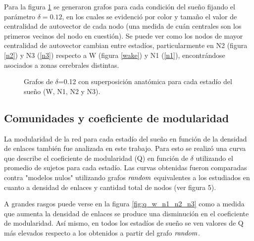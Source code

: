 \documentclass{article}
\begin{document}
Para la figura \ref{condiciones_w_n1_n2_n3} se generaron grafos para cada condición del sueño fijando el parámetro $\delta=0.12$, en los cuales se evidenció por color y tamaño el valor de centralidad de autovector de cada nodo (una medida de cuán centrales son los primeros vecinos del nodo en cuestión). Se puede ver como los nodos de mayor centralidad de autovector cambian entre estadíos, particularmente en N2 (figura \ref{n2}) y N3 (\ref{n3}) respecto a W (figura \ref{wake}) y N1 (\ref{n1}), encontrándose asociados a zonas cerebrales distintas.

\begin{figure}[H]
    \centering
    \hfill
    \hfill
    \hfill
    \hfill
    \caption[]{Grafos de $\delta$=0.12 con superposición anatómica para cada estadío del sueño (W, N1, N2 y N3).\footnotemark }
    \label{condiciones_w_n1_n2_n3}
\end{figure}

\subsection{Comunidades y coeficiente de modularidad}

La modularidad de la red para cada estadío del sueño en función de la densidad de enlaces también fue analizada en este trabajo. Para esto se realizó una curva que describe el coeficiente de modularidad (Q) en función de $\delta$ utilizando el promedio de sujetos para cada estadío. Las curvas obtenidas fueron comparadas contra "modelos nulos" utilizando grafos $\it random$ equivalentes a los estudiados en cuanto a densidad de enlaces y cantidad total de nodos (ver figura 5).


A grandes rasgos puede verse en la figura \ref{fig:q_w_n1_n2_n3} como a medida que aumenta la densidad de enlaces se produce una disminución en el coeficiente de modularidad. Así mismo, en todos los estadíos de sueño se ven valores de Q más elevados respecto a los obtenidos a partir del grafo $\it random$.
\end{document}
